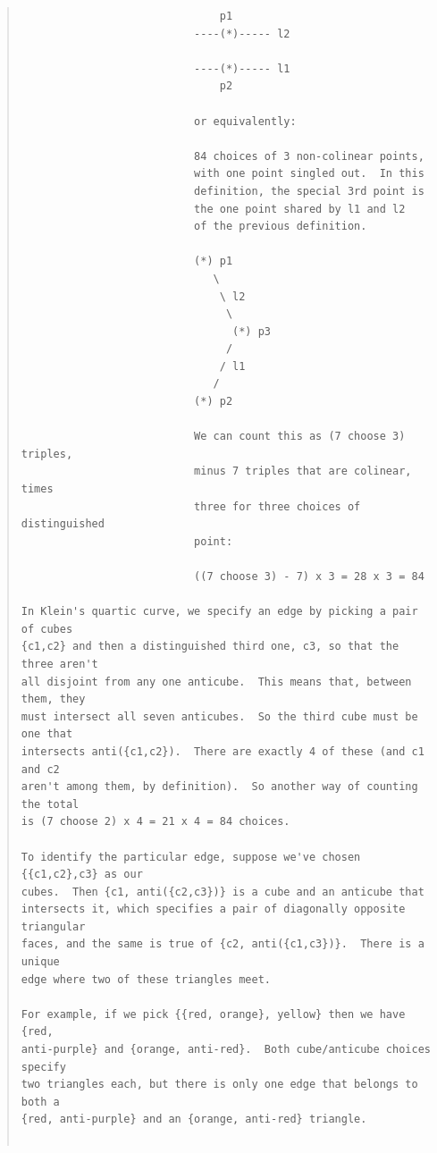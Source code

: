 \documentclass{article}
\begin{document}
\begin{quote}
\begin{verbatim}
                               p1
                           ----(*)----- l2

                           ----(*)----- l1
                               p2

                           or equivalently:

                           84 choices of 3 non-colinear points,
                           with one point singled out.  In this
                           definition, the special 3rd point is
                           the one point shared by l1 and l2
                           of the previous definition.

                           (*) p1
                              \
                               \ l2
                                \
                                 (*) p3
                                /
                               / l1
                              /
                           (*) p2

                           We can count this as (7 choose 3) triples,
                           minus 7 triples that are colinear, times
                           three for three choices of distinguished
                           point:

                           ((7 choose 3) - 7) x 3 = 28 x 3 = 84

In Klein's quartic curve, we specify an edge by picking a pair of cubes 
{c1,c2} and then a distinguished third one, c3, so that the three aren't 
all disjoint from any one anticube.  This means that, between them, they 
must intersect all seven anticubes.  So the third cube must be one that 
intersects anti({c1,c2}).  There are exactly 4 of these (and c1 and c2 
aren't among them, by definition).  So another way of counting the total 
is (7 choose 2) x 4 = 21 x 4 = 84 choices.

To identify the particular edge, suppose we've chosen {{c1,c2},c3} as our 
cubes.  Then {c1, anti({c2,c3})} is a cube and an anticube that 
intersects it, which specifies a pair of diagonally opposite triangular 
faces, and the same is true of {c2, anti({c1,c3})}.  There is a unique 
edge where two of these triangles meet.

For example, if we pick {{red, orange}, yellow} then we have {red, 
anti-purple} and {orange, anti-red}.  Both cube/anticube choices specify 
two triangles each, but there is only one edge that belongs to both a 
{red, anti-purple} and an {orange, anti-red} triangle.


\end{verbatim}
\end{quote}
\end{document}
